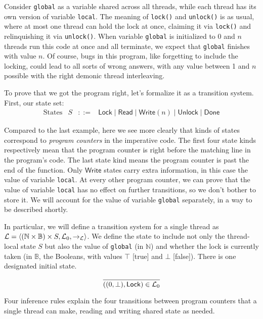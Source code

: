 \documentclass{amsbook}
\theoremstyle{definition}
\theoremstyle{remark}
\numberwithin{section}{chapter}
\numberwithin{equation}{chapter}
\begin{document}
Consider \texttt{global} as a variable shared across all threads, while each thread has its own version of variable \texttt{local}.
The meaning of \texttt{lock()} and \texttt{unlock()} is as usual, where at most one thread can hold the lock at once, claiming it via \texttt{lock()} and relinquishing it via \texttt{unlock()}.
When variable \texttt{global} is initialized to 0 and $n$ threads run this code at once and all terminate, we expect that \texttt{global} finishes with value $n$.
Of course, bugs in this program, like forgetting to include the locking, could lead to all sorts of wrong answers, with any value between 1 and $n$ possible with the right demonic thread interleaving.

\encoding
To prove that we got the program right, let's formalize it as a transition system.  First, our state set:
$$\begin{array}{rrcl}
  \textrm{States} & S &::=& \mathsf{Lock} \mid \mathsf{Read} \mid \mathsf{Write}(n) \mid \mathsf{Unlock} \mid \mathsf{Done}
\end{array}$$

Compared to the last example, here we see more clearly that kinds of states correspond to \emph{program counters} in the imperative code.
The first four state kinds respectively mean that the program counter is right before the matching line in the program's code.
The last state kind means the program counter is past the end of the function.
Only $\mathsf{Write}$ states carry extra information, in this case the value of variable \texttt{local}.
At every other program counter, we can prove that the value of variable \texttt{local} has no effect on further transitions, so we don't bother to store it.
We will account for the value of variable \texttt{global} separately, in a way to be described shortly.

In particular, we will define a transition system for a single thread as $\mathcal L = {\left \langle (\mathbb N \times \mathbb B) \times S, \mathcal L_0, \to_{\mathcal L} \right \rangle}$.
We define the state to include not only the thread-local state $S$ but also the value of \texttt{global} (in $\mathbb N$) and whether the lock is currently taken (in $\mathbb B$, the Booleans, with values $\top$ [true] and $\bot$ [false]).
There is one designated initial state.

$$\infer{((0, \bot), \mathsf{Lock}) \in \mathcal L_0}{}$$

Four inference rules explain the four transitions between program counters that a single thread can make, reading and writing shared state as needed.
\end{document}
